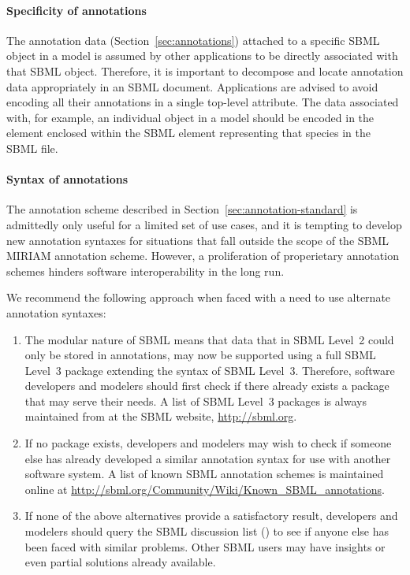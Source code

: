 \paragraph{Specificity of annotations}

The annotation data (Section~\ref{sec:annotations}) attached to a
specific SBML object in a model is assumed by other applications
to be directly associated with that SBML object.  Therefore, it is
important to decompose and locate annotation data appropriately in
an SBML document.  Applications are advised to avoid encoding all
their annotations in a single top-level attribute.  The data
associated with, for example, an individual \Species object in a
model should be encoded in the  element
enclosed within the SBML  element representing
that species in the SBML file.


\paragraph{Syntax of annotations}

The annotation scheme described in
Section~\ref{sec:annotation-standard} is admittedly only useful
for a limited set of use cases, and it is tempting to develop new
annotation syntaxes for situations that fall outside the scope of
the SBML MIRIAM annotation scheme.  However, a proliferation of
properietary annotation schemes hinders software interoperability
in the long run.

We recommend the following approach when faced with a need to use
alternate annotation syntaxes:
\begin{enumerate}

\item The modular nature of SBML \thisLV means that data that in
  SBML Level~2 could only be stored in annotations, may now be
  supported using a full SBML Level~3 package extending the syntax
  of SBML Level~3.  Therefore, software developers and modelers
  should first check if there already exists a package that may
  serve their needs.  A list of SBML Level~3 packages is always
  maintained from at the SBML website, \url{http://sbml.org}.
  
\item If no package exists, developers and modelers may wish to
  check if someone else has already developed a similar annotation
  syntax for use with another software system.  A list of known
  SBML annotation schemes is maintained online at 
  \url{http://sbml.org/Community/Wiki/Known_SBML_annotations}.

\item If none of the above alternatives provide a satisfactory
  result, developers and modelers should query the SBML discussion
  list ()
  to see if anyone else has been faced with similar problems.
  Other SBML users may have insights or even partial solutions
  already available.

\end{enumerate}


